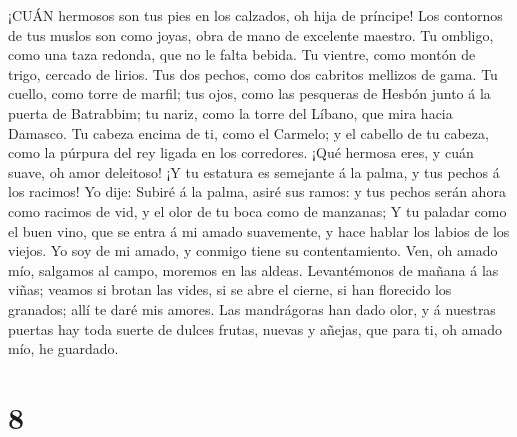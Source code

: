  ¡CUÁN hermosos son tus pies en los calzados, oh hija de
príncipe! Los contornos de tus muslos son como joyas, obra de mano de
excelente maestro.  Tu ombligo, como una taza redonda, que
no le falta bebida. Tu vientre, como montón de trigo, cercado de lirios.
 Tus dos pechos, como dos cabritos mellizos de gama.
 Tu cuello, como torre de marfil; tus ojos, como las
pesqueras de Hesbón junto á la puerta de Batrabbim; tu nariz, como la
torre del Líbano, que mira hacia Damasco.  Tu cabeza encima
de ti, como el Carmelo; y el cabello de tu cabeza, como la púrpura del
rey ligada en los corredores.  ¡Qué hermosa eres, y cuán
suave, oh amor deleitoso!  ¡Y tu estatura es semejante á la
palma, y tus pechos á los racimos!  Yo dije: Subiré á la
palma, asiré sus ramos: y tus pechos serán ahora como racimos de vid, y
el olor de tu boca como de manzanas;  Y tu paladar como el
buen vino, que se entra á mi amado suavemente, y hace hablar los labios
de los viejos.  Yo soy de mi amado, y conmigo tiene su
contentamiento.  Ven, oh amado mío, salgamos al campo,
moremos en las aldeas.  Levantémonos de mañana á las viñas;
veamos si brotan las vides, si se abre el cierne, si han florecido los
granados; allí te daré mis amores.  Las mandrágoras han
dado olor, y á nuestras puertas hay toda suerte de dulces frutas, nuevas
y añejas, que para ti, oh amado mío, he guardado.

\hypertarget{section-7}{%
\section{8}\label{section-7}}

